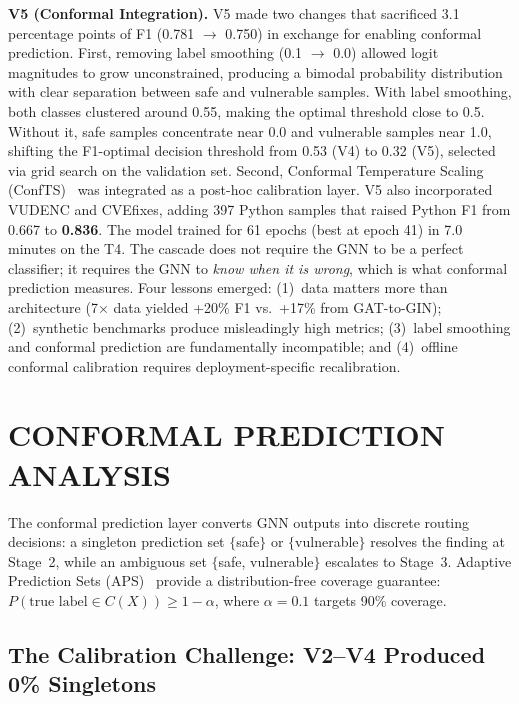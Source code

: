 \textbf{V5 (Conformal Integration).} V5 made two changes that sacrificed 3.1 percentage points of F1 (0.781 $\rightarrow$ 0.750)
in exchange for enabling conformal prediction.
First, removing label smoothing (0.1 $\rightarrow$ 0.0) allowed logit magnitudes
to grow unconstrained, producing a bimodal probability distribution with clear
separation between safe and vulnerable samples.
With label smoothing, both classes clustered around 0.55, making the optimal
threshold close to 0.5.
Without it, safe samples concentrate near 0.0 and vulnerable samples near 1.0,
shifting the F1-optimal decision threshold from 0.53 (V4) to 0.32 (V5),
selected via grid search on the validation set.
Second, Conformal Temperature Scaling (ConfTS)~\cite{dabah2024} was integrated
as a post-hoc calibration layer. V5 also incorporated VUDENC and CVEfixes, adding 397 Python samples that raised Python F1 from 0.667 to \textbf{0.836}. The model trained for 61 epochs (best at epoch 41) in 7.0 minutes on the T4. The cascade does not require the GNN to be a perfect classifier; it requires the GNN to \emph{know when it is wrong}, which is what conformal prediction measures. Four lessons emerged: (1)~data matters more than architecture (7$\times$ data yielded +20\% F1 vs.\ +17\% from GAT-to-GIN); (2)~synthetic benchmarks produce misleadingly high metrics; (3)~label smoothing and conformal prediction are fundamentally incompatible; and (4)~offline conformal calibration requires deployment-specific recalibration.

\section{\uppercase{Conformal Prediction Analysis}}
\label{sec:conformal}

The conformal prediction layer converts GNN outputs into discrete routing decisions: a singleton prediction set $\{$safe$\}$ or $\{$vulnerable$\}$ resolves the finding at Stage~2, while an ambiguous set $\{$safe, vulnerable$\}$ escalates to Stage~3. Adaptive Prediction Sets (APS)~\cite{angelopoulos2023} provide a distribution-free coverage guarantee: $P(\text{true label} \in C(X)) \geq 1 - \alpha$, where $\alpha = 0.1$ targets 90\% coverage.

\subsection{The Calibration Challenge: V2--V4 Produced 0\% Singletons}

